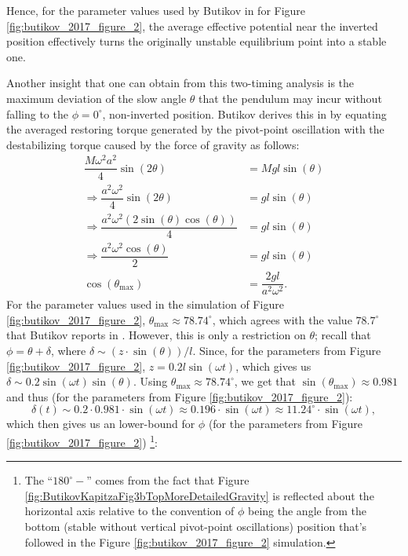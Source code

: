 \documentclass[12pt, letterpaper]{article}
\begin{document}
Hence, for the parameter values used by Butikov in \cite{Butikov2017KapitzaS} for Figure \ref{fig:butikov_2017_figure_2}, the average effective potential near the inverted position effectively turns the originally unstable equilibrium point into a stable one. \par Another insight that one can obtain from this two-timing analysis is the maximum deviation of the slow angle $\theta$ that the pendulum may incur without falling to the $\phi=0^\circ$, non-inverted position. Butikov derives this in \cite{Butikov2017KapitzaS} by equating the averaged restoring torque generated by the pivot-point oscillation with the destabilizing torque caused by the force of gravity as follows:
\begin{align}
  \dfrac{M\omega^2
a^2}{4}\sin(2\theta) &= Mgl\sin(\theta) \nonumber \\
\Rightarrow \dfrac{a^2\omega^2}{4}\sin(2\theta) &= gl\sin(\theta)  \nonumber \\
\Rightarrow \dfrac{a^2\omega^2\left(2\sin(\theta)\cos(\theta)\right)}{4} &= gl\sin(\theta)  \nonumber \\
\Rightarrow \dfrac{a^2\omega^2\cos(\theta)}{2} &= gl\sin(\theta)  \nonumber \\
\cos\left(\theta_{\mathrm{max}}\right) &= \dfrac{2gl}{a^2\omega^2} \label{eq:max_slow_angle_dev}.
\end{align}
For the parameter values used in the simulation of Figure \ref{fig:butikov_2017_figure_2}, $\theta_{\mathrm{max}} \approx 78.74^\circ$, which agrees with the value $78.7^\circ$ that Butikov reports in \cite{Butikov2017KapitzaS}. However, this is only a restriction on $\theta$; recall that $\phi = \theta + \delta$, where $\delta \sim (z \cdot \sin(\theta)) / l$. Since, for the parameters from Figure \ref{fig:butikov_2017_figure_2}, $z = 0.2 l \sin(\omega t)$, which gives us $\delta \sim 0.2 \sin(\omega t)\sin(\theta)$. Using $\theta_{\mathrm{max}} \approx 78.74^\circ$, we get that $\sin(\theta_{\mathrm{max}}) \approx 0.981$ and thus (for the parameters from Figure \ref{fig:butikov_2017_figure_2}):
\begin{equation}
    \delta(t) \sim 0.2\cdot 0.981 \cdot  \sin(\omega t) \approx 0.196 \cdot \sin(\omega t) \approx 11.24^\circ \cdot \sin(\omega t),
\end{equation}
which then gives us an lower-bound for $\phi$ (for the parameters from Figure \ref{fig:butikov_2017_figure_2})
\footnote{The ``$180^\circ -$'' comes from the fact that Figure \ref{fig:ButikovKapitzaFig3bTopMoreDetailedGravity} is reflected about the horizontal axis relative to the convention of $\phi$ being the angle from the bottom (stable without vertical pivot-point oscillations) position that's followed in the Figure \ref{fig:butikov_2017_figure_2} simulation.}:
\end{document}
